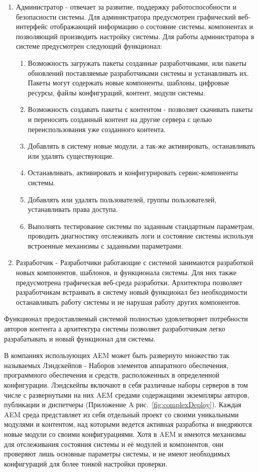 \begin{enumerate}
\item Администратор - отвечает за развитие, поддержку работоспособности и безопасности системы. Для администратора предусмотрен графический веб-интерфейс отображающий информацию о состояние системы, компонентах и позволяющий производить настройку системы. Для работы администратора в системе предусмотрен следующий функционал:
\begin{enumerate}
\item Возможность загружать пакеты созданные разработчиками, или пакеты обновлений поставляемые разработчиками системы и устанавливать их. Пакеты могут содержать новые компоненты, шаблоны, цифровые ресурсы, файлы конфигураций, контент, модули системы. 
\item Возможность создавать пакеты с контентом - позволяет скачивать пакеты и переносить созданный контент на другие сервера с целью переиспользования уже созданного контента. 
\item Добавлять в систему новые модули, а так-же активировать, останавливать или удалять существующие. 
\item Останавливать, активировать и конфигурировать сервис-компоненты системы. 
\item Добавлять или удалять пользователей, группы пользователей, устанавливать права доступа. 
\item Выполнять тестирование системы по заданным стандартным параметрам, проводить диагностику отслеживать логи и состояние системы используя встроенные механизмы с заданными параметрами.
\end{enumerate}
\item Разработчик - Разработчики работающие с системой занимаются разработкой новых компонентов, шаблонов, и функционала системы. Для них также предусмотрена графическая веб-среда разработки. Архитектора позволяет разработчикам встраивать в систему новый функционал без необходимости останавливать работу системы и не нарушая работу других компонентов.
\end{enumerate}

Функционал предоставляемый системой полностью удовлетворяет потребности авторов контента а архитектура системы позволяет разработчикам легко разрабатывать и новый функционал для системы.

В компаниях использующих AEM может быть развернуто множество так называемых Лэндскейпов - Наборов элементов аппаратного обеспечения, программного обеспечения и средств, расположенных в определенной конфигурации. Лэндскейпы включают в себя различные наборы серверов в том числе с развернутыми на них AEM средами содержащими экземпляры авторов, публикации и диспетчеры (Приложение A рис.~\ref{fig:complexDeploy}). Каждая AEM среда представляет из себя отдельный проект со своими уникальными модулями и контентом, над которыми ведется активная разработка и внедряются новые модули со своими конфигурациями. Хотя в AEM и имеются механизмы для отслеживания состояния системы и её модулей и компонентов, они проверяют лишь основные параметры системы, и не имеют необходимых конфигураций для более тонкой настройки проверки. 

